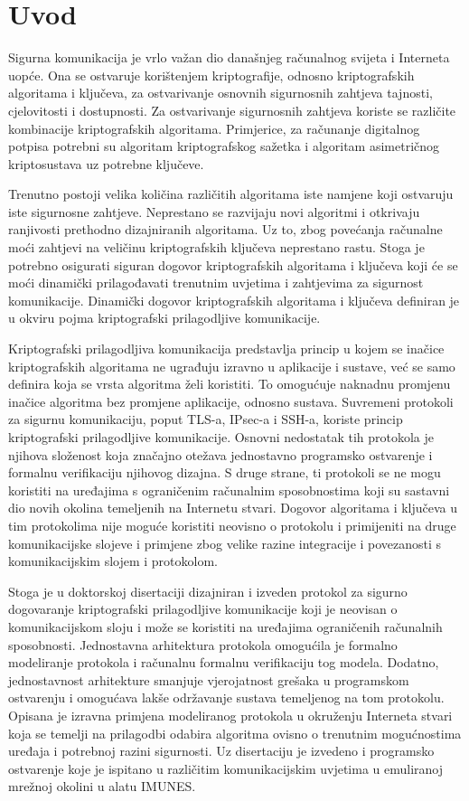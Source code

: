 \chapter{Uvod}

Sigurna komunikacija je vrlo važan dio današnjeg računalnog svijeta i Interneta
uopće. Ona se ostvaruje korištenjem kriptografije, odnosno kriptografskih
algoritama i ključeva, za ostvarivanje osnovnih sigurnosnih zahtjeva
tajnosti, cjelovitosti i dostupnosti. Za ostvarivanje sigurnosnih zahtjeva
koriste se različite kombinacije kriptografskih algoritama. Primjerice, za
računanje digitalnog potpisa potrebni su algoritam kriptografskog sažetka i
algoritam asimetričnog kriptosustava uz potrebne ključeve.

Trenutno postoji velika količina različitih algoritama iste namjene koji ostvaruju
iste sigurnosne zahtjeve. Neprestano se razvijaju novi algoritmi i otkrivaju
ranjivosti prethodno dizajniranih algoritama. Uz to, zbog povećanja računalne
moći zahtjevi na veličinu kriptografskih ključeva neprestano rastu. Stoga je
potrebno osigurati siguran dogovor kriptografskih algoritama i ključeva koji će
se moći dinamički prilagođavati trenutnim uvjetima i zahtjevima za sigurnost
komunikacije. Dinamički dogovor kriptografskih algoritama i ključeva definiran
je u okviru pojma kriptografski prilagodljive komunikacije.

Kriptografski prilagodljiva komunikacija predstavlja princip u kojem se
inačice kriptografskih algoritama ne ugrađuju izravno u aplikacije i sustave,
već se samo definira koja se vrsta algoritma želi koristiti. To omogućuje
naknadnu promjenu inačice algoritma bez promjene aplikacije, odnosno sustava.
Suvremeni protokoli za sigurnu komunikaciju, poput TLS-a, IPsec-a i SSH-a,
koriste princip kriptografski prilagodljive komunikacije. Osnovni nedostatak tih
protokola je njihova složenost koja značajno otežava jednostavno programsko
ostvarenje i
formalnu verifikaciju njihovog dizajna. S druge strane, ti protokoli se ne mogu
koristiti na uređajima s ograničenim računalnim sposobnostima koji su sastavni
dio novih okolina temeljenih na Internetu stvari. Dogovor algoritama i ključeva
u tim protokolima nije moguće koristiti neovisno o protokolu i primijeniti na
druge komunikacijske slojeve i primjene zbog velike razine integracije i
povezanosti s komunikacijskim slojem i protokolom.

Stoga je u doktorskoj disertaciji dizajniran i izveden protokol za sigurno
dogovaranje
kriptografski prilagodljive komunikacije koji je neovisan o komunikacijskom
sloju i može se koristiti na uređajima ograničenih računalnih sposobnosti.
Jednostavna arhitektura protokola omogućila je formalno modeliranje protokola i
računalnu formalnu verifikaciju tog modela. Dodatno, jednostavnost arhitekture
smanjuje vjerojatnost grešaka u programskom ostvarenju i omogućava lakše održavanje
sustava temeljenog na tom protokolu. Opisana je izravna primjena
modeliranog protokola u okruženju Interneta stvari koja se temelji na prilagodbi
odabira algoritma ovisno o trenutnim mogućnostima uređaja i potrebnoj razini
sigurnosti. Uz disertaciju je izvedeno i programsko ostvarenje koje je ispitano u
različitim komunikacijskim uvjetima u emuliranoj mrežnoj okolini u alatu
IMUNES.

